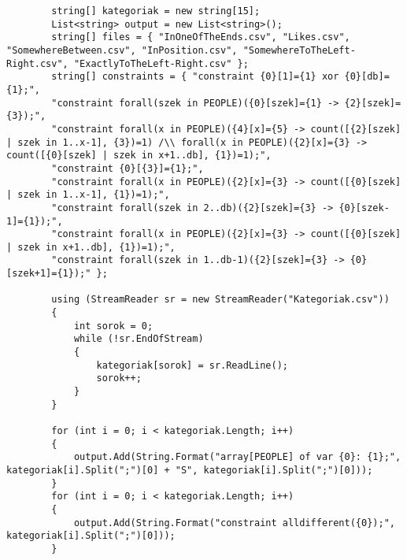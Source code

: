 \documentclass[12pt,a4paper,twoside, openright]{report}
\begin{document}
    
	\begin{lstlisting}
		string[] kategoriak = new string[15];
		List<string> output = new List<string>();
		string[] files = { "InOneOfTheEnds.csv", "Likes.csv", "SomewhereBetween.csv", "InPosition.csv", "SomewhereToTheLeft-Right.csv", "ExactlyToTheLeft-Right.csv" };
		string[] constraints = { "constraint {0}[1]={1} xor {0}[db]={1};",
		"constraint forall(szek in PEOPLE)({0}[szek]={1} -> {2}[szek]={3});",
		"constraint forall(x in PEOPLE)({4}[x]={5} -> count([{2}[szek] | szek in 1..x-1], {3})=1) /\\ forall(x in PEOPLE)({2}[x]={3} -> count([{0}[szek] | szek in x+1..db], {1})=1);",
		"constraint {0}[{3}]={1};",
		"constraint forall(x in PEOPLE)({2}[x]={3} -> count([{0}[szek] | szek in 1..x-1], {1})=1);",
		"constraint forall(szek in 2..db)({2}[szek]={3} -> {0}[szek-1]={1});",
		"constraint forall(x in PEOPLE)({2}[x]={3} -> count([{0}[szek] | szek in x+1..db], {1})=1);",
		"constraint forall(szek in 1..db-1)({2}[szek]={3} -> {0}[szek+1]={1});" };
		
		using (StreamReader sr = new StreamReader("Kategoriak.csv"))
		{
			int sorok = 0;
			while (!sr.EndOfStream)
			{
				kategoriak[sorok] = sr.ReadLine();
				sorok++;
			}
		}
		
		for (int i = 0; i < kategoriak.Length; i++)
		{
			output.Add(String.Format("array[PEOPLE] of var {0}: {1};", kategoriak[i].Split(";")[0] + "S", kategoriak[i].Split(";")[0]));
		}
		for (int i = 0; i < kategoriak.Length; i++)
		{
			output.Add(String.Format("constraint alldifferent({0});", kategoriak[i].Split(";")[0]));
		}
	\end{lstlisting}
    
\end{document}
